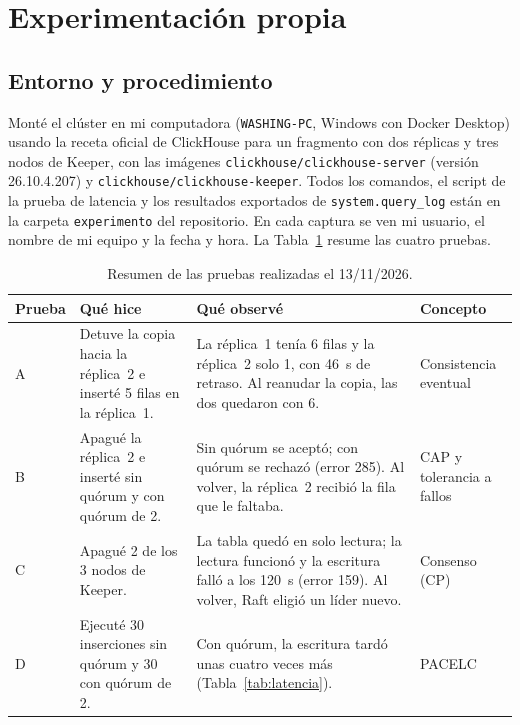 \documentclass[12pt,a4paper]{article}
\begin{document}
\section{Experimentación propia}\label{sec:experimento}

\subsection{Entorno y procedimiento}

Monté el clúster en mi computadora (\texttt{WASHING-PC}, Windows con
Docker Desktop) usando la receta oficial de ClickHouse para un fragmento
con dos réplicas y tres nodos de Keeper, con las imágenes
\texttt{clickhouse/clickhouse-server} (versión 26.10.4.207) y
\texttt{clickhouse/clickhouse-keeper}. Todos los comandos, el script de
la prueba de latencia y los resultados exportados de
\texttt{system.query\_log} están en la carpeta \texttt{experimento} del
repositorio. En cada captura se ven mi usuario, el nombre de mi equipo y
la fecha y hora. La Tabla~\ref{tab:pruebas} resume las cuatro pruebas.

\begin{table}[htbp]
  \centering
  \caption{Resumen de las pruebas realizadas el 13/11/2026.}
  \label{tab:pruebas}
  \small
  \begin{tabularx}{\linewidth}{@{}l X X l@{}}
    \toprule
    \textbf{Prueba} & \textbf{Qué hice} & \textbf{Qué observé} &
      \textbf{Concepto} \\
    \midrule
    A & Detuve la copia hacia la réplica~2 e inserté 5 filas en la
      réplica~1. & La réplica~1 tenía 6 filas y la réplica~2 solo 1, con
      46~s de retraso. Al reanudar la copia, las dos quedaron con 6. &
      Consistencia eventual \\
    B & Apagué la réplica~2 e inserté sin quórum y con quórum de 2. &
      Sin quórum se aceptó; con quórum se rechazó (error 285). Al volver,
      la réplica~2 recibió la fila que le faltaba. & CAP y tolerancia a
      fallos \\
    C & Apagué 2 de los 3 nodos de Keeper. & La tabla quedó en solo
      lectura; la lectura funcionó y la escritura falló a los 120~s
      (error 159). Al volver, Raft eligió un líder nuevo. & Consenso
      (CP) \\
    D & Ejecuté 30 inserciones sin quórum y 30 con quórum de 2. & Con
      quórum, la escritura tardó unas cuatro veces más
      (Tabla~\ref{tab:latencia}). & PACELC \\
    \bottomrule
  \end{tabularx}
\end{table}
\end{document}
